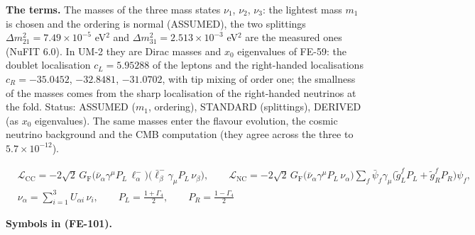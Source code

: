 \documentclass[
  10pt,
]{article}
\begin{document}
\textbf{The terms.} The masses of the three mass states \(\nu_1\),
\(\nu_2\), \(\nu_3\): the lightest mass \(m_1\) is chosen and the
ordering is normal (ASSUMED), the two splittings
\(\Delta m_{21}^2 = 7.49\times10^{-5}\) eV\(^2\) and
\(\Delta m_{31}^2 = 2.513\times10^{-3}\) eV\(^2\) are the measured ones
(NuFIT 6.0). In UM-2 they are Dirac masses and \(x_0\) eigenvalues of
FE-59: the doublet localisation \(c_L = 5.95288\) of the leptons and the
right-handed localisations \(c_R = -35.0452\), \(-32.8481\),
\(-31.0702\), with tip mixing of order one; the smallness of the masses
comes from the sharp localisation of the right-handed neutrinos at the
fold. Status: ASSUMED (\(m_1\), ordering), STANDARD (splittings),
DERIVED (as \(x_0\) eigenvalues). The same masses enter the flavour
evolution, the cosmic neutrino background and the CMB computation (they
agree across the three to \(5.7\times10^{-12}\)).

\[
\begin{aligned}
&\mathcal{L}_{\mathrm{CC}} = -2\sqrt2\,G_{\mathrm{F}}\big(\bar\nu_\alpha\gamma^\mu P_L\,\ell^-_\alpha\big)
 \big(\bar\ell^-_\beta\gamma_\mu P_L\,\nu_\beta\big),\qquad
 \mathcal{L}_{\mathrm{NC}} = -2\sqrt2\,G_{\mathrm{F}}\big(\bar\nu_\alpha\gamma^\mu P_L\,\nu_\alpha\big)
 \sum_f\bar\psi_f\gamma_\mu\big(\tilde g^f_LP_L + \tilde g^f_RP_R\big)\psi_f,\\
&\nu_\alpha = \sum_{i=1}^{3}U_{\alpha i}\,\nu_i,\qquad P_L = \frac{1 + \Gamma_4}{2},\qquad P_R = \frac{1
 - \Gamma_4}{2}
\end{aligned} \tag{FE-101}
\]

\textbf{Symbols in (FE-101).}
\end{document}
